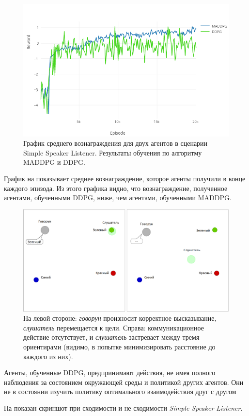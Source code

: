 \begin{figure}[ht!]
    \center
    \includegraphics [scale=0.60] {my_folder/images/ch5/ssl-rew.png}
    \caption{График среднего вознаграждения для двух агентов в сценарии Simple Speaker Listener. Результаты обучения по алгоритму MADDPG и DDPG.}
    \label{fig:result-ssl-rew}
\end{figure}

График на  показывает среднее вознаграждение, которое агенты получили в конце каждого эпизода. Из этого графика видно, что вознаграждение, полученное агентами, обученными DDPG, ниже, чем агентами, обученными MADDPG.

\begin{figure}[ht!]
    \center
    \includegraphics [scale=0.45] {my_folder/images/ch5/results-ssl-conv-non-conv.png}
    \caption{На левой стороне: \textit{говорун} произносит корректное высказывание, \textit{слушатель} перемещается к цели. Справа: коммуникационное действие отсутствует, и \textit{слушатель} застревает между тремя ориентирами (видимо, в попытке минимизировать расстояние до каждого из них).}
    \label{fig:result-conv-non-conv}
\end{figure}

Агенты, обученные DDPG, предпринимают действия, не имея полного наблюдения за состоянием окружающей среды и политикой других агентов. Они не в состоянии изучить политику оптимального взаимодействия друг с другом

На  показан скриншот при сходимости и не сходимости \textit{Simple Speaker Listener}.
